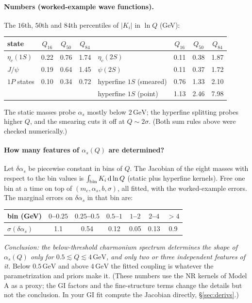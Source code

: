\documentclass[11pt,a4paper]{article}
\numberwithin{equation}{section}
\theoremstyle{definition}
\theoremstyle{plain}
\theoremstyle{remark}
\numberwithin{algorithm}{section}
\newcommand{\as}{\alpha_s}
\newcommand{\dd}{\mathrm{d}}
\newcommand{\GeV}{\,\mathrm{GeV}}
\begin{document}
\paragraph{Numbers (worked-example wave functions).} The $16$th, $50$th and $84$th percentiles of $|K_i|$ in $\ln Q$ (GeV):
\begin{center}\small
\begin{tabular}{@{}lccc|lccc@{}}\toprule
state & $Q_{16}$ & $Q_{50}$ & $Q_{84}$ & & $Q_{16}$ & $Q_{50}$ & $Q_{84}$\\\midrule
$\eta_c(1S)$ & 0.22 & 0.76 & 1.74 & $\eta_c(2S)$ & 0.11 & 0.38 & 1.87\\
$J/\psi$ & 0.19 & 0.64 & 1.45 & $\psi(2S)$ & 0.11 & 0.37 & 1.72\\
$1P$ states & 0.10 & 0.34 & 0.72 & hyperfine $1S$ (smeared) & 0.76 & 1.33 & 2.10\\
 & & & & hyperfine $1S$ (point) & 1.13 & 2.46 & 7.98\\\bottomrule
\end{tabular}
\end{center}
The static masses probe $\as$ mostly below $2\GeV$; the hyperfine splitting probes higher $Q$, and the smearing cuts it off at $Q\sim2\sigma$. (Both sum rules above were checked numerically.)

\paragraph{How many features of $\as(Q)$ are determined?} Let $\delta\as$ be piecewise constant in bins of $Q$. The Jacobian of the eight masses with respect to the bin values is $\int_{\rm bin}K_i\,\dd\ln Q$ (static plus hyperfine kernels). Free one bin at a time on top of $(m_c,\as,b,\sigma)$, all fitted, with the worked-example errors. The marginal errors on $\delta\as$ in that bin are:
\begin{center}\small
\begin{tabular}{@{}lcccccc@{}}\toprule
bin (GeV) & $0$--$0.25$ & $0.25$--$0.5$ & $0.5$--$1$ & $1$--$2$ & $2$--$4$ & $>4$\\\midrule
$\sigma(\delta\as)$ & 1.1 & 0.54 & 0.12 & 0.05 & 0.13 & 0.9\\\bottomrule
\end{tabular}
\end{center}
\emph{Conclusion: the below-threshold charmonium spectrum determines the shape of $\as(Q)$ only for $0.5\lesssim Q\lesssim4\GeV$, and only two or three independent features of it.} Below $0.5\GeV$ and above $4\GeV$ the fitted coupling is whatever the parametrization and priors make it. (These numbers use the NR kernels of Model A as a proxy; the GI factors and the fine-structure terms change the details but not the conclusion. In your GI fit compute the Jacobian directly, \S\ref{sec:derivs}.)
\end{document}
